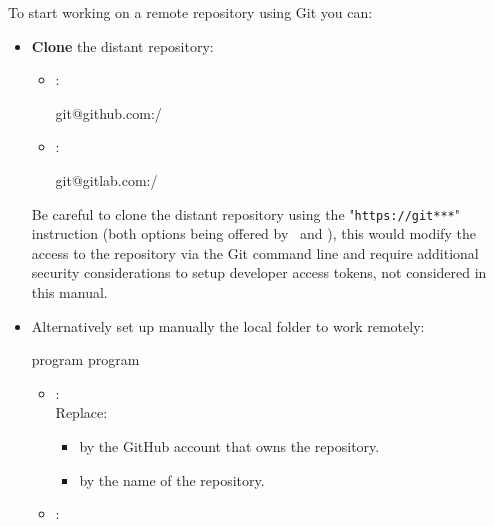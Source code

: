 To start working on a remote repository using Git you can:
\begin{itemize}
\item {\bf{Clone}} the distant repository:
\begin{itemize}
\item \github:
{\footnotesize{
\begin{scriptii}
  git@github.com:/
\end{scriptii}
}}
\item \gitlab:
{\footnotesize{
\begin{scriptii}
  git@gitlab.com:/
\end{scriptii}
}}
\end{itemize}
\noindent Be careful  to clone the distant repository using the "\texttt{https://git***}" instruction 
(both options being offered by \github\ and \gitlab), 
this would modify the access to the repository via the Git command line and require additional security considerations to setup 
developer access tokens, not considered in this manual. \\[0.25cm]
\item Alternatively set up manually the local folder to work remotely:
{\footnotesize{
\begin{scripti}
\fprompt{~}  program
\fprompt{~}  program
 
\end{scripti}
}}
\begin{itemize}
\item \github:
{}
\\[-0.75cm]
\noindent Replace:
\begin{itemize}
\item {}\quad by the GitHub account that owns the repository.
\item {}\quad by the name of the repository. \\
\end{itemize}
\item \gitlab:
{}
\end{itemize}
\end{itemize}
